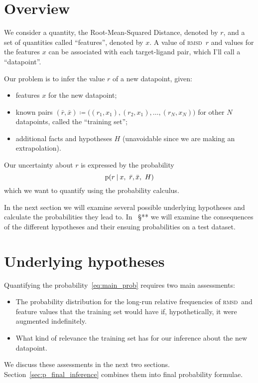 \documentclass[\ifafour a4paper,12pt,\else a5paper,10pt,\fi%
onecolumn,oneside,article,%
british%
]{memoir}
\theoremstyle{remark}
\theoremstyle{innote}
\newcommand*{\defd}{\coloneqq}
\newcommand*{\p}{\mathrm{p}}%
\renewcommand*{\|}[1][]{\nonscript\:#1\vert\nonscript\:\mathopen{}}
\renewcommand*{\=}{\TextOrMath\texteq\eq}
\newcommand*{\sect}{\S}%
\newcommand*{\wrench}{{\fontencoding{U}\fontfamily{fontawesomethree}\selectfont\symbol{114}}}
\newcommand{\mynote}[1]{ {\color{notecolour}#1}}
\newcommand*{\rmsd}{\textsc{rmsd}}
\newcommand*{\ro}{r}
\newcommand*{\xo}{x}
\newcommand*{\rd}{\bar{r}}
\newcommand*{\xd}{\bar{x}}
\begin{document}
\section{Overview}
\label{sec:overview}

We consider a quantity, the Root-Mean-Squared Distance, denoted by $r$, and
a set of quantities called \enquote{features}, denoted by $x$. A
value of \rmsd\ $r$
and values for the  features $x$ can be associated with each target-ligand
pair, which I'll call a \enquote{datapoint}.

Our problem is to infer the value $\ro$ of a new datapoint, given:
\begin{itemize}
\item features $\xo$ for the new datapoint;
\item known pairs
  $(\rd,\xd) \defd \bigl((r_{1}, x_{1}), (r_{2}, x_{1}), \dotsc, (r_{N},
  x_{N})\bigr)$ for other $N$ datapoints, called the \enquote{training
    set};
\item additional facts and hypotheses $H$ (unavoidable since we are making an
extrapolation).
\end{itemize}

Our uncertainty about $\ro$ is expressed by the probability
\begin{equation}
  \label{eq:main_prob}
  \p(\ro \| \xo,\ \rd,\xd,\ H)
\end{equation}
which we want to quantify using the probability calculus.

In the next section we will examine several possible underlying hypotheses
and calculate the probabilities they lead to. In \mynote{\wrench\ \sect***}
we will examine the consequences of the different hypotheses and their
ensuing probabilities on a test dataset.


\section{Underlying hypotheses}
\label{sec:hypotheses}

Quantifying the probability~\eqref{eq:main_prob} requires two main
assessments:
\begin{itemize}
\item The probability distribution for the long-run relative frequencies of
  \rmsd\ and feature values that the training set would have if,
  hypothetically, it were augmented indefinitely.
\item What kind of relevance the training set has for our inference about
  the new datapoint.
\end{itemize}
We discuss these assessments in the next two sections.
Section~\ref{sec:p_final_inference} combines them into final probability
formulae.
\end{document}
